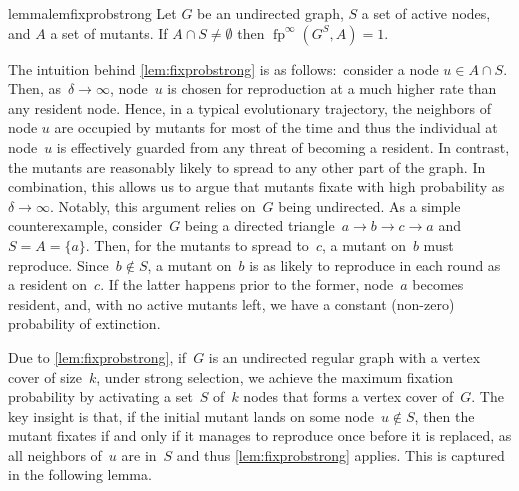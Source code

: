 \documentclass[letterpaper]{article}
\newcommand{\X}{\mathsf{X}}
\newcommand{\fp}{\operatorname{fp}}
\newcommand{\FitAdv}{\delta}
\begin{document}
\begin{restatable}{lemma}{lemfixprobstrong}\label{lem:fixprobstrong}
Let $G$ be an undirected graph, $S$ a set of active nodes, and $A$ a set of mutants. If  $A\cap S\neq \emptyset$ then $\fp^{\infty}(G^S, A)=1$.
\end{restatable}

The intuition behind \cref{lem:fixprobstrong} is as follows:~consider a node $u\in A\cap S$.
Then, as~$\FitAdv\to\infty$, node~$u$ is chosen for reproduction at a much higher rate than any resident node.
Hence, in a typical evolutionary trajectory, the neighbors of node $u$ are occupied by mutants for most of the time and thus the individual at node~$u$ is effectively guarded from any threat of becoming a resident.
In contrast, the mutants are reasonably likely to spread to any other part of the graph.
In combination, this allows us to argue that mutants fixate with high probability as~$\FitAdv\to\infty$.
Notably, this argument relies on~$G$ being undirected.
As a simple counterexample, consider~$G$ being a directed triangle~$a\to b\to c\to a$ and~$S = A = \{a\}$.
Then, for the mutants to spread to~$c$, a mutant on~$b$ must reproduce.
Since~$b\not \in S$, a mutant on~$b$ is as likely to reproduce in each round as a resident on~$c$.
If the latter happens prior to the former, node~$a$ becomes resident, and, with no active mutants left, we have a constant (non-zero) probability of extinction.

Due to \cref{lem:fixprobstrong}, if~$G$ is an undirected regular graph with a vertex cover of size~$k$, under strong selection, we achieve the maximum fixation probability by activating a set~$S$ of~$k$ nodes that forms a vertex cover of~$G$. The key insight is that, if the initial mutant lands on some node~$u\not \in S$, then the mutant fixates if and  only if it manages to reproduce once before it is replaced, as all neighbors of~$u$ are in~$S$ and thus \cref{lem:fixprobstrong} applies. This is captured in the following lemma.
\end{document}
